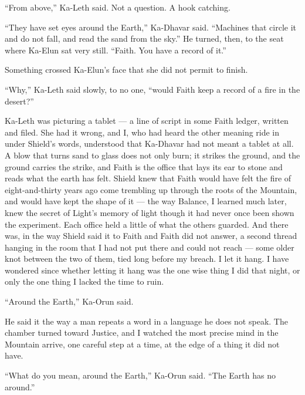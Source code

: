 ``From above,'' Ka-Leth said. Not a question. A hook catching.\par
 
``They have set eyes around the Earth,'' Ka-Dhavar said. ``Machines that circle it and do not fall, and read the sand from the sky.'' He turned, then, to the seat where Ka-Elun sat very still. ``Faith. You have a record of it.''\par
 
Something crossed Ka-Elun's face that she did not permit to finish.\par
 
``Why,'' Ka-Leth said slowly, to no one, ``would Faith keep a record of a fire in the desert?''\par
 
Ka-Leth was picturing a tablet — a line of script in some Faith ledger, written and filed. She had it wrong, and I, who had heard the other meaning ride in under Shield's words, understood that Ka-Dhavar had not meant a tablet at all. A blow that turns sand to glass does not only burn; it strikes the ground, and the ground carries the strike, and Faith is the office that lays its ear to stone and reads what the earth has felt. Shield knew that Faith would have felt the fire of eight-and-thirty years ago come trembling up through the roots of the Mountain, and would have kept the shape of it — the way Balance, I learned much later, knew the secret of Light's memory of light though it had never once been shown the experiment. Each office held a little of what the others guarded. And there was, in the way Shield said it to Faith and Faith did not answer, a second thread hanging in the room that I had not put there and could not reach — some older knot between the two of them, tied long before my breach. I let it hang. I have wondered since whether letting it hang was the one wise thing I did that night, or only the one thing I lacked the time to ruin.\par
 
\ornament
 
``Around the Earth,'' Ka-Orun said.\par
 
He said it the way a man repeats a word in a language he does not speak. The chamber turned toward Justice, and I watched the most precise mind in the Mountain arrive, one careful step at a time, at the edge of a thing it did not have.\par
 
``What do you mean, around the Earth,'' Ka-Orun said. ``The Earth has no around.''\par
 
